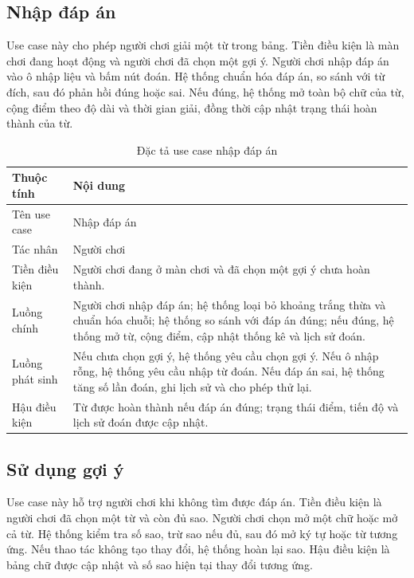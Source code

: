 \documentclass[../DoAn.tex]{subfiles}
\begin{document}
\subsection{Nhập đáp án}
Use case này cho phép người chơi giải một từ trong bảng. Tiền điều kiện là màn chơi đang hoạt động và người chơi đã chọn một gợi ý. Người chơi nhập đáp án vào ô nhập liệu và bấm nút đoán. Hệ thống chuẩn hóa đáp án, so sánh với từ đích, sau đó phản hồi đúng hoặc sai. Nếu đúng, hệ thống mở toàn bộ chữ của từ, cộng điểm theo độ dài và thời gian giải, đồng thời cập nhật trạng thái hoàn thành của từ.

\begin{table}[H]
\centering
\begin{tabularx}{\textwidth}{|>{\RaggedRight\arraybackslash}p{3.2cm}|>{\RaggedRight\arraybackslash}X|}
\hline
\textbf{Thuộc tính} & \textbf{Nội dung} \\ \hline
Tên use case & Nhập đáp án \\ \hline
Tác nhân & Người chơi \\ \hline
Tiền điều kiện & Người chơi đang ở màn chơi và đã chọn một gợi ý chưa hoàn thành. \\ \hline
Luồng chính & Người chơi nhập đáp án; hệ thống loại bỏ khoảng trắng thừa và chuẩn hóa chuỗi; hệ thống so sánh với đáp án đúng; nếu đúng, hệ thống mở từ, cộng điểm, cập nhật thống kê và lịch sử đoán. \\ \hline
Luồng phát sinh & Nếu chưa chọn gợi ý, hệ thống yêu cầu chọn gợi ý. Nếu ô nhập rỗng, hệ thống yêu cầu nhập từ đoán. Nếu đáp án sai, hệ thống tăng số lần đoán, ghi lịch sử và cho phép thử lại. \\ \hline
Hậu điều kiện & Từ được hoàn thành nếu đáp án đúng; trạng thái điểm, tiến độ và lịch sử đoán được cập nhật. \\ \hline
\end{tabularx}
\caption{Đặc tả use case nhập đáp án}
\label{table:uc_guess}
\end{table}

\subsection{Sử dụng gợi ý}
Use case này hỗ trợ người chơi khi không tìm được đáp án. Tiền điều kiện là người chơi đã chọn một từ và còn đủ sao. Người chơi chọn mở một chữ hoặc mở cả từ. Hệ thống kiểm tra số sao, trừ sao nếu đủ, sau đó mở ký tự hoặc từ tương ứng. Nếu thao tác không tạo thay đổi, hệ thống hoàn lại sao. Hậu điều kiện là bảng chữ được cập nhật và số sao hiện tại thay đổi tương ứng.
\end{document}
